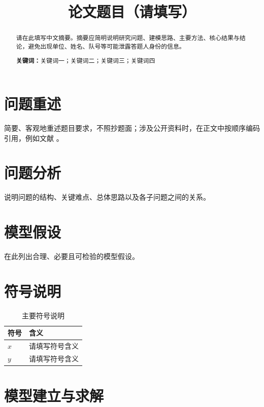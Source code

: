 \documentclass[withoutpreface,bwprint]{cumcmthesis}
\title{论文题目（请填写）}
\begin{document}
\setcounter{page}{0}
\maketitle
\thispagestyle{empty}

\begin{abstract}
请在此填写中文摘要。摘要应简明说明研究问题、建模思路、主要方法、核心结果与结论，避免出现单位、姓名、队号等可能泄露答题人身份的信息。

\noindent\textbf{关键词：}关键词一；关键词二；关键词三；关键词四
\end{abstract}

\setcounter{page}{1}

\section{问题重述}
简要、客观地重述题目要求，不照抄题面；涉及公开资料时，在正文中按顺序编码引用，例如文献 \cite{example}。

\section{问题分析}
说明问题的结构、关键难点、总体思路以及各子问题之间的关系。

\section{模型假设}
在此列出合理、必要且可检验的模型假设。

\section{符号说明}
\begin{table}[htbp]
  \centering
  \caption{主要符号说明}
  \begin{tabularx}{0.9\textwidth}{>{\centering\arraybackslash}p{}X}
    \toprule
    符号 & 含义 \\
    \midrule
    $x$ & 请填写符号含义 \\
    $y$ & 请填写符号含义 \\
    \bottomrule
  \end{tabularx}
\end{table}

\section{模型建立与求解}
\end{document}
